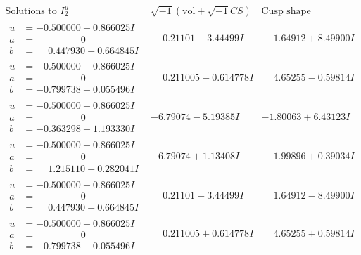 \documentclass[1p]{elsarticle_modified}
\theoremstyle{definition}
\newcommand{\I}{\sqrt{-1}}
\begin{document}
$$\begin{array}{c|c|c}  
\text{Solutions to }I^u_{2}& \I (\text{vol} + \sqrt{-1}CS) & \text{Cusp shape}\\
 \hline 
\begin{aligned}
u &= -0.500000 + 0.866025 I \\
a &= \phantom{-0.000000 } 0 \\
b &= \phantom{-}0.447930 - 0.664845 I\end{aligned}
 & \phantom{-}0.21101 - 3.44499 I & \phantom{-}1.64912 + 8.49900 I \\ \hline\begin{aligned}
u &= -0.500000 + 0.866025 I \\
a &= \phantom{-0.000000 } 0 \\
b &= -0.799738 + 0.055496 I\end{aligned}
 & \phantom{-}0.211005 - 0.614778 I & \phantom{-}4.65255 - 0.59814 I \\ \hline\begin{aligned}
u &= -0.500000 + 0.866025 I \\
a &= \phantom{-0.000000 } 0 \\
b &= -0.363298 + 1.193330 I\end{aligned}
 & -6.79074 - 5.19385 I & -1.80063 + 6.43123 I \\ \hline\begin{aligned}
u &= -0.500000 + 0.866025 I \\
a &= \phantom{-0.000000 } 0 \\
b &= \phantom{-}1.215110 + 0.282041 I\end{aligned}
 & -6.79074 + 1.13408 I & \phantom{-}1.99896 + 0.39034 I \\ \hline\begin{aligned}
u &= -0.500000 - 0.866025 I \\
a &= \phantom{-0.000000 } 0 \\
b &= \phantom{-}0.447930 + 0.664845 I\end{aligned}
 & \phantom{-}0.21101 + 3.44499 I & \phantom{-}1.64912 - 8.49900 I \\ \hline\begin{aligned}
u &= -0.500000 - 0.866025 I \\
a &= \phantom{-0.000000 } 0 \\
b &= -0.799738 - 0.055496 I\end{aligned}
 & \phantom{-}0.211005 + 0.614778 I & \phantom{-}4.65255 + 0.59814 I \\ \hline\begin{aligned}

\end{aligned}
\end{array}$$
\end{document}
